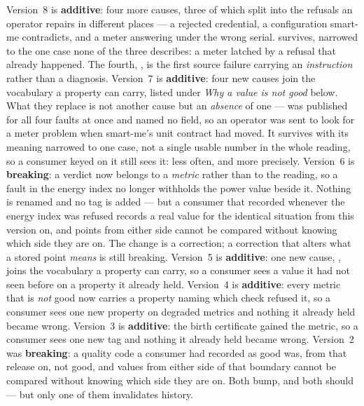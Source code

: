 Version~8
is \textbf{additive}: four more causes, three of which split  into the
refusals an operator repairs in different places --- a rejected credential, a configuration
smart-me contradicts, and a meter answering under the wrong serial. 
survives, narrowed to the one case none of the three describes: a meter latched by a refusal that
already happened. The fourth, , is the first source failure carrying an
\emph{instruction} rather than a diagnosis. Version~7
is \textbf{additive}: four new causes join the vocabulary a  property can carry,
listed under \emph{Why a value is not good} below. What they replace is not another cause but an
\emph{absence} of one ---  was published for all four faults at once and
named no field, so an operator was sent to look for a meter problem when smart-me's unit contract
had moved. It survives with its meaning narrowed to one case, not a single usable number in the
whole reading, so a consumer keyed on it still sees it: less often, and more precisely. Version~6
is \textbf{breaking}: a verdict now belongs to a \emph{metric} rather than to the reading, so a
fault in the energy index no longer withholds the power value beside it. Nothing is renamed and no
tag is added --- but a consumer that recorded  whenever the energy index was
refused records a real value for the identical situation from this version on, and points from
either side cannot be compared without knowing which side they are on. The change is a correction;
a correction that alters what a stored point \emph{means} is still breaking. Version~5
is \textbf{additive}: one new cause, , joins the vocabulary a
 property can carry, so a consumer sees a value it had not seen before on a
property it already held. Version~4
is \textbf{additive}: every metric that is \emph{not} good now carries a 
property naming which check refused it, so a consumer sees one new property on degraded
metrics and nothing it already held became wrong. Version~3
is \textbf{additive}: the birth certificate gained the  metric, so
a consumer sees one new tag and nothing it already held became wrong. Version~2 was
\textbf{breaking}: a quality code a consumer had recorded as good was, from that release on,
not good, and values from either side of that boundary cannot be compared without knowing
which side they are on. Both bump, and both should --- but only one of them invalidates
history.

